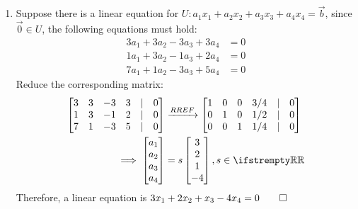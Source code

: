\documentclass[12pt, a4paper]{article}
\begin{document}
\begin{enumerate}[Q\arabic*.]
\begin{enumerate}[(\alph*)]
      \item Suppose there is a linear equation for $U: a_1x_1 + a_2x_2 + a_3x_3 + a_4x_4 = \vec{b}$, since $\vec{0} \in U$, the following equations must hold:
        \begin{align*}
          3a_1 + 3a_2 -3a_3 + 3a_4 &= 0\\
          1a_1 + 3a_2 -1a_3 + 2a_4 &= 0\\
          7a_1 + 1a_2 -3a_3 + 5a_4 &= 0
        \end{align*}
        Reduce the corresponding matrix:
        \begin{align*}
          \begin{bmatrix}
            3 & 3 & -3 & 3 &|& 0\\
            1 & 3 & -1 & 2 &|& 0\\
            7 & 1 & -3 & 5 &|& 0\\
          \end{bmatrix}&\xrightarrow{RREF}
          \begin{bmatrix}
            1 & 0 & 0 & 3 /4 &|& 0\\
            0 & 1 & 0 & 1 /2 &|& 0\\
            0 & 0 & 1 & 1 /4 &|& 0
          \end{bmatrix}\\
          \implies \begin{bmatrix}a_1\\a_2\\a_3\\a_4\end{bmatrix} &= s\begin{bmatrix}3\\2\\1\\-4\end{bmatrix}, s \in \RR
        \end{align*}
        Therefore, a linear equation is $3x_1 + 2x_2 + x_3 -4x_4 = 0 \qed$


\end{enumerate}
\end{enumerate}
\end{document}

